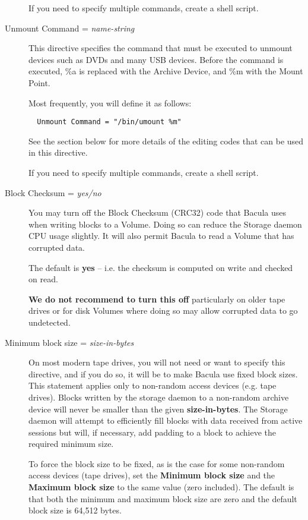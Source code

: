 \begin{description}
  If you need to specify multiple commands, create a shell script.

\item [Unmount Command = {\it name-string}]
   This directive specifies the command that must be executed to unmount 
   devices such as DVDs and many USB devices. Before the command  is
   executed, \%a is replaced with the Archive Device, and \%m with the  Mount
   Point.

   Most frequently, you will define it as follows:  

\footnotesize
\begin{verbatim}
  Unmount Command = "/bin/umount %m"
\end{verbatim}
\normalsize

See the  section below for more details of
the editing codes that can be used in this directive.

  If you need to specify multiple commands, create a shell script.

\item[Block Checksum = {\it yes/no}]

  You may turn off the Block Checksum (CRC32) code that Bacula uses when
  writing blocks to a Volume. Doing so can reduce the Storage daemon CPU usage
  slightly.  It will also permit Bacula to read a Volume that has corrupted
  data.

  The default is {\bf yes} -- i.e. the checksum is computed on write and
  checked on read.

  \textbf{We do not recommend to turn this off} particularly on older tape
  drives or for disk Volumes where doing so may allow corrupted data to go
  undetected.

\item [Minimum block size = {\it size-in-bytes}]
   On most modern tape drives, you will not need or want to specify this
   directive, and if you do so, it will be to make Bacula use fixed block
   sizes.  This statement applies only to non-random access devices (e.g.
   tape drives).  Blocks written by the storage daemon to a non-random
   archive device will never be smaller than the given {\bf size-in-bytes}.
   The Storage daemon will attempt to efficiently fill blocks with data
   received from active sessions but will, if necessary, add padding to a
   block to achieve the required minimum size.
   
   To force the block size to be fixed, as is the case for some non-random
   access devices (tape drives), set the {\bf Minimum block size} and the
   {\bf Maximum block size} to the same value (zero included).  The default
   is that both the minimum and maximum block size are zero and the default
   block size is 64,512 bytes. 
   

\end{description}
